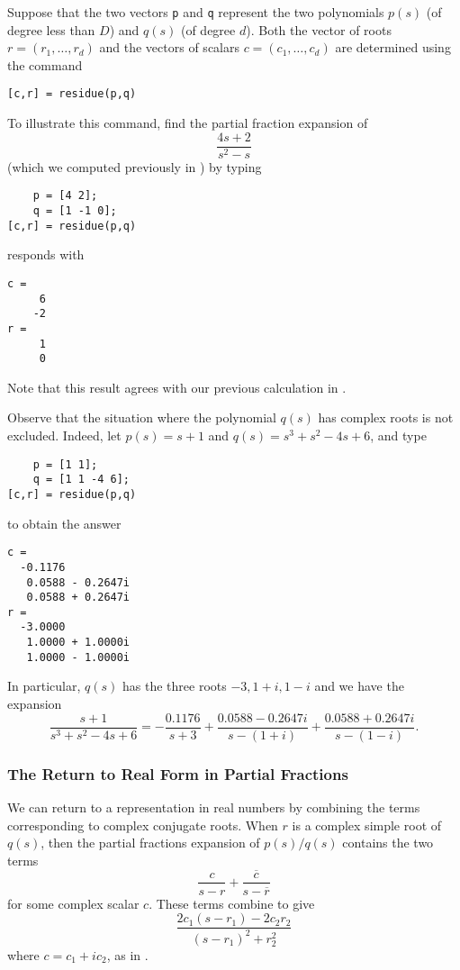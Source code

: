 \documentclass{ximera}
\begin{document}
Suppose that the two vectors {\tt p} and {\tt q} represent the two polynomials 
$p(s)$ (of degree less than $D$) and $q(s)$ (of degree $d$).  Both the vector 
of roots $r=(r_1,\ldots,r_d)$ and the vectors of scalars $c=(c_1,\ldots,c_d)$ 
are determined using the command 
\begin{verbatim}
[c,r] = residue(p,q)
\end{verbatim}

To illustrate this command, find the partial fraction expansion of 
\[
\frac{4s+2}{s^2-s}
\]
(which we computed previously in ) by typing
\begin{verbatim}
    p = [4 2];
    q = [1 -1 0];
[c,r] = residue(p,q)
\end{verbatim}
\Matlab responds with
\begin{verbatim}
c =
     6
    -2
r =
     1
     0
\end{verbatim}
Note that this result agrees with our previous calculation in .

Observe that the situation where the polynomial $q(s)$ has complex roots 
is not excluded.  Indeed, let $p(s) = s+1$ and $q(s) = s^3+s^2-4s+6$, and type
\begin{verbatim}
    p = [1 1];
    q = [1 1 -4 6];
[c,r] = residue(p,q)
\end{verbatim}
to obtain the answer
\begin{verbatim}
c =
  -0.1176          
   0.0588 - 0.2647i
   0.0588 + 0.2647i
r =
  -3.0000          
   1.0000 + 1.0000i
   1.0000 - 1.0000i
\end{verbatim}
In particular, $q(s)$ has the three roots $-3,1+i,1-i$ and we have
the expansion
\begin{equation}   \label{e:realfex}
\frac{s+1}{s^3+s^2-4s+6} = -\frac{0.1176}{s+3}+\frac{0.0588 - 0.2647i}{s-(1+i)}+
\frac{0.0588 + 0.2647i}{s-(1-i)}.
\end{equation}

\subsubsection*{The Return to Real Form in Partial Fractions}

We can return to a representation in real numbers by combining the terms 
corresponding to complex conjugate roots.  When $r$ is a complex simple root 
of $q(s)$, then the partial fractions expansion of $p(s)/q(s)$ contains 
the two terms
\[
\frac{c}{s-r} + \frac{\overline{c}}{s-\overline{r}}
\]
for some complex scalar $c$.  These terms combine to give
\[
\frac{2c_1(s-r_1)-2c_2r_2}{(s-r_1)^2+r_2^2}
\]
where $c=c_1+ic_2$, as in .
\end{document}
